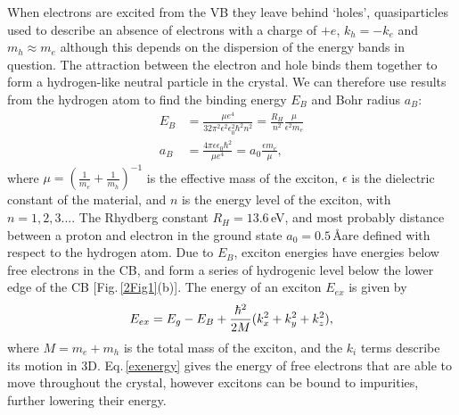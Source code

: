 When electrons are excited from the VB they leave behind `holes', quasiparticles used to describe an absence of electrons with a charge of $+e$, $k_h = -k_e$ and $m_h \approx m_e$ although this depends on the dispersion of the energy bands in question. The attraction between the electron and hole binds them together to form a hydrogen-like neutral particle in the crystal. We can therefore use results from the hydrogen atom to find the binding energy $E_B$ and Bohr radius $a_B$:
\begin{subequations}
\label{ex3D}
\begin{align}
E_B &=\frac{\mu e^4}{32\pi^2\epsilon^2\epsilon_0^2\hbar^2n^2} = \frac{R_H}{n^2}\frac{\mu}{\epsilon^2 m_e} \label{exbinding3D}\\
a_B &= \frac{4\pi\epsilon\epsilon_0\hbar^2}{\mu e^4}=a_0\frac{\epsilon m_e}{\mu} \label{exrad3D},
\end{align}
\end{subequations}
where $\mu = (\frac{1}{m_e}+\frac{1}{m_h})^{-1}$ is the effective mass of the exciton, $\epsilon$ is the dielectric constant of the material, and $n$ is the energy level of the exciton, with $n=1, 2, 3...$. The Rhydberg constant $R_H=13.6$\,eV, and most probably distance between a proton and electron in the ground state $a_0=0.5$\,\AA are defined with respect to the hydrogen atom. Due to $E_B$, exciton energies have energies below free electrons in the CB, and form a series of hydrogenic level below the lower edge of the CB [Fig.\,\ref{2Fig1}(b)]. The energy of an exciton $E_{ex}$ is given by
\begin{equation}
\centering
E_{ex} = E_g - E_B + \frac{\hbar^2}{2M}(k_x^2+k_y^2+k_z^2),
\label{exenergy}
\end{equation}
where $M = m_e+m_h$ is the total mass of the exciton, and the $k_i$ terms describe its motion in 3D. Eq.\,\ref{exenergy} gives the energy of free electrons that are able to move throughout the crystal, however excitons can be bound to impurities, further lowering their energy.

